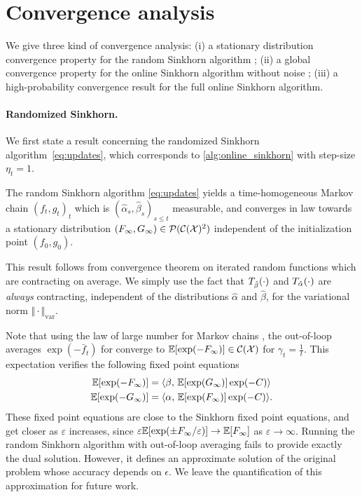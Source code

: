 

\section{Convergence analysis}

We give three kind of convergence analysis: (i) a stationary distribution convergence property for the random Sinkhorn
algorithm ; (ii) a global convergence property for the online Sinkhorn algorithm without noise ; (iii) a high-probability convergence result for the full online Sinkhorn algorithm.

\paragraph{Randomized Sinkhorn.}

We first state a result concerning the randomized Sinkhorn algorithm~\eqref{eq:updates}, which corresponds to
\autoref{alg:online_sinkhorn} with step-size $\eta_t = 1$.

\begin{proposition}\label{prop:markov}
    The random Sinkhorn algorithm \eqref{eq:updates} yields a time-homogeneous
    Markov chain ${(f_t, g_t)}_t$ which is $(\hat \alpha_s, \hat \beta_s)_{s \leq
    t}$ measurable, and converges in law towards a stationary distribution
    $(F_\infty, G_\infty) \in \mathcal{P}(\mathcal{C}(\mathcal{X})^2)$ independent of the initialization
    point $(f_0, g_0)$.
\end{proposition}

This result follows from \citet{diaconis_iterated} convergence theorem on
iterated random functions which are contracting on average. We simply use the
fact that $T_{\hat \beta}(\cdot)$ and $T_{\hat \alpha}(\cdot)$ are
\textit{always} contracting, independent of the distributions $\hat \alpha$ and
$\hat \beta$, for the variational norm $\Vert \cdot \Vert_{\text{var}}$.

Note that using the law of large number for Markov chains
\citep{breiman_strong_1960}, the out-of-loop averages $\exp(-\bar f_t)$ for
converge to $\mathbb{E}[\exp(-F_\infty)] \in \mathcal{C}(\mathcal{X})$ for $\gamma_t = \frac{1}{t}$. This expectation verifies the following fixed point equations
\begin{align}
    \mathbb{E}[\exp(-F_\infty)] &=
     \langle \beta,\,\mathbb{E}[\exp(G_\infty)] \exp(-C)\rangle \\
    \mathbb{E}[\exp(-G_\infty)] &=
     \langle \alpha,\,\mathbb{E}[\exp(F_\infty)] \exp(-C)\rangle.
\end{align}
These fixed point equations are close to the Sinkhorn fixed point equations, and
get closer as $\varepsilon$ increases, since $\varepsilon \mathbb{E}[\exp(\pm F_\infty /
\varepsilon)] \to \mathbb{E}[F_\infty]$ as $\varepsilon \to \infty$. Running the random
Sinkhorn algorithm with out-of-loop averaging fails to provide exactly the dual solution.
However, it defines an approximate solution of the original problem whose accuracy depends on $\epsilon$. 
%
We leave the quantification of this approximation for future work.

